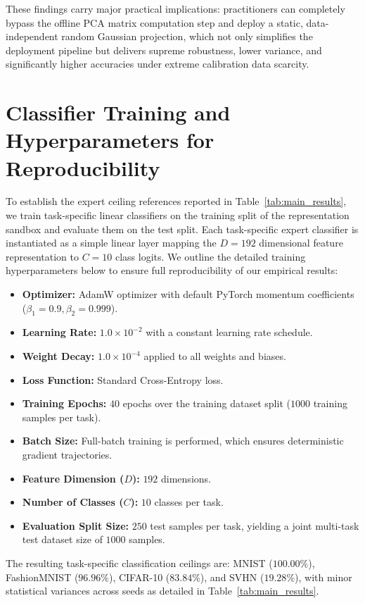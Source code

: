 These findings carry major practical implications: practitioners can completely bypass the offline
PCA matrix computation step and deploy a static, data-independent random Gaussian projection, which
not only simplifies the deployment pipeline but delivers supreme robustness, lower variance, and
significantly higher accuracies under extreme calibration data scarcity.

\section{Classifier Training and Hyperparameters for Reproducibility}
\label{sec:reproducibility}

To establish the expert ceiling references reported in Table~\ref{tab:main_results}, we train
task-specific linear classifiers on the training split of the representation sandbox and evaluate
them on the test split. Each task-specific expert classifier is instantiated as a simple linear
layer mapping the $D=192$ dimensional feature representation to $C=10$ class logits. We outline the
detailed training hyperparameters below to ensure full reproducibility of our empirical results:
\begin{itemize}
    \item \textbf{Optimizer:} AdamW optimizer with default PyTorch momentum coefficients ($\beta_1
= 0.9, \beta_2 = 0.999$).
    \item \textbf{Learning Rate:} $1.0 \times 10^{-2}$ with a constant learning rate schedule.
    \item \textbf{Weight Decay:} $1.0 \times 10^{-4}$ applied to all weights and biases.
    \item \textbf{Loss Function:} Standard Cross-Entropy loss.
    \item \textbf{Training Epochs:} $40$ epochs over the training dataset split ($1000$ training
samples per task).
    \item \textbf{Batch Size:} Full-batch training is performed, which ensures deterministic
gradient trajectories.
    \item \textbf{Feature Dimension ($D$):} $192$ dimensions.
    \item \textbf{Number of Classes ($C$):} $10$ classes per task.
    \item \textbf{Evaluation Split Size:} $250$ test samples per task, yielding a joint multi-task
test dataset size of $1000$ samples.
\end{itemize}

The resulting task-specific classification ceilings are: MNIST ($100.00\%$), FashionMNIST
($96.96\%$), CIFAR-10 ($83.84\%$), and SVHN ($19.28\%$), with minor statistical variances across
seeds as detailed in Table~\ref{tab:main_results}.

